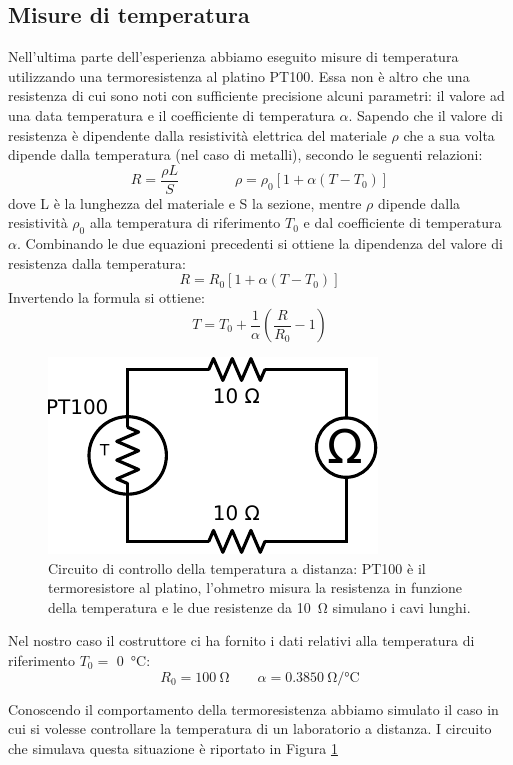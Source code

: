 \subsection{Misure di temperatura}

Nell'ultima parte dell'esperienza abbiamo eseguito misure di temperatura utilizzando una termoresistenza al platino PT100.
Essa non è altro che una resistenza di cui sono noti con sufficiente precisione alcuni parametri: il valore ad una data temperatura e il coefficiente di temperatura $\alpha$.
Sapendo che il valore di resistenza è dipendente dalla resistività elettrica del materiale $\rho$ che a sua volta dipende dalla temperatura (nel caso di metalli), secondo le seguenti relazioni:
	$$	R = \frac{\rho L}{S}
			\qquad \qquad
		\rho = \rho_0 \left[ 1 + \alpha \left( T - T_0 \right) \right]$$
dove L è la lunghezza del materiale e S la sezione, mentre $\rho$ dipende dalla resistività $\rho_0$ alla temperatura di riferimento $T_0$ e dal coefficiente di temperatura $\alpha$.
Combinando le due equazioni precedenti si ottiene la dipendenza del valore di resistenza dalla temperatura:
\begin{equation}
R = R_0 \left[ 1 + \alpha \left( T - T_0 \right) \right]
\end{equation}
Invertendo la formula si ottiene:
\begin{equation}
T = T_0 + \frac{1}{\alpha}\left( \frac{R}{R_0}-1 \right)
\end{equation}
\begin{figure}
\centering
\includegraphics[width=.25\textwidth]{../E05/latex/c_PT100_2wire.pdf}
\caption{Circuito di controllo della temperatura a distanza: PT100 è il termoresistore al platino, l'ohmetro misura la resistenza in funzione della temperatura e le due resistenze da \SI{10}{\ohm} simulano i cavi lunghi.}
\label{cir5:2wire}
\end{figure}
Nel nostro caso il costruttore ci ha fornito i dati relativi alla temperatura di riferimento $T_0 =$ \SI{0}{\degreeCelsius}:
$$R_0 = \SI{100}{\ohm} \quad \quad \alpha = \SI[per-mode=symbol]{0.3850}{\ohm\per\degreeCelsius}$$

Conoscendo il comportamento della termoresistenza abbiamo simulato il caso in cui si volesse controllare la temperatura di un laboratorio a distanza.
I circuito che simulava questa situazione è riportato in Figura \ref{cir5:2wire}

